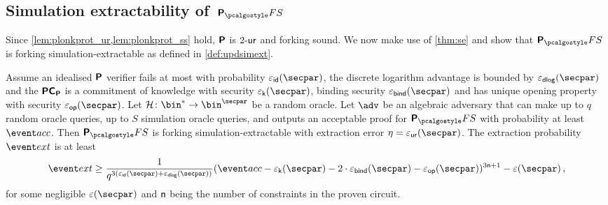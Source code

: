 \subsection{Simulation extractability of~$\plonkprotfs$}
Since \cref{lem:plonkprot_ur,lem:plonkprot_ss} hold, $\bm{\mathsf{P}}$ is ${2\text{-}\mathsf{ur}}$
and forking sound. We now make use of \cref{thm:se} and show that
$\plonkprot_\fs$ is forking simulation-extractable as defined in
\cref{def:updsimext}.

\begin{corollary}
\label{thm:plonkprotfs_se}
Assume an idealised $\bm{\mathsf{P}}$ verifier fails at most with probability
$\epsid(\secpar)$, the discrete logarithm advantage is bounded by
$\epsdlog(\secpar)$ and the $\bm{\mathsf{PC}}_{\bm{\mathsf{P}}}$ is a commitment of knowledge with security
$\epsk(\secpar)$, binding security $\epsbind(\secpar)$ and has unique opening
property with security $\epsop(\secpar)$. Let
$\ro\colon \bin^* \to \bin^\secpar$ be a random oracle. Let $\advse$ be an
algebraic adversary that can make up to $q$ random oracle queries, up to $S$
simulation oracle queries, and outputs an acceptable proof for $\plonkprotfs$
with probability at least $\accProb$. Then $\plonkprotfs$ is forking
simulation-extractable with extraction error $\eta = \epsur(\secpar)$. The
extraction probability $\extProb$ is at least
\[
	\extProb \geq \frac{1}{q^{3 (\epsid(\secpar)+\epsdlog(\secpar))}} (\accProb - \epsk(\secpar) - 2\cdot\epsbind(\secpar) -
  \epsop(\secpar))^{3\noofc + 1} -\eps(\secpar)\,,
\]
for some negligible $\eps(\secpar)$ and $\mathsf{n}$ being the number of
constraints in the proven circuit.
\end{corollary}
 
